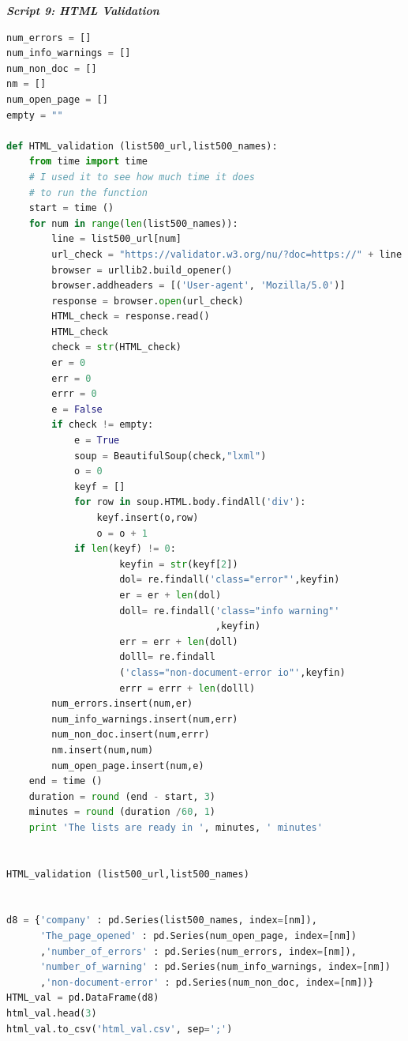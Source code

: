\documentclass{book}
\begin{document}
\begin{center}
\textit{\textbf{Script 9: HTML Validation}}\label{p9}
\end{center}
\begin{lstlisting}[language=Python]
num_errors = []
num_info_warnings = []
num_non_doc = [] 
nm = []
num_open_page = []
empty = ""
 
def HTML_validation (list500_url,list500_names):
    from time import time 
    # I used it to see how much time it does
    # to run the function
    start = time ()
    for num in range(len(list500_names)):
        line = list500_url[num] 
        url_check = "https://validator.w3.org/nu/?doc=https://" + line
        browser = urllib2.build_opener()
        browser.addheaders = [('User-agent', 'Mozilla/5.0')]
        response = browser.open(url_check)
        HTML_check = response.read()
        HTML_check
        check = str(HTML_check)
        er = 0
        err = 0
        errr = 0
        e = False
        if check != empty:
            e = True
            soup = BeautifulSoup(check,"lxml")
            o = 0
            keyf = []
            for row in soup.HTML.body.findAll('div'):
                keyf.insert(o,row)
                o = o + 1                    
            if len(keyf) != 0:       
                    keyfin = str(keyf[2])                     
                    dol= re.findall('class="error"',keyfin)            
                    er = er + len(dol)
                    doll= re.findall('class="info warning"'
                                     ,keyfin)            
                    err = err + len(doll)
                    dolll= re.findall
                    ('class="non-document-error io"',keyfin)            
                    errr = errr + len(dolll)
        num_errors.insert(num,er)
        num_info_warnings.insert(num,err)
        num_non_doc.insert(num,errr)  
        nm.insert(num,num) 
        num_open_page.insert(num,e)
    end = time ()
    duration = round (end - start, 3)
    minutes = round (duration /60, 1)
    print 'The lists are ready in ', minutes, ' minutes'
 

HTML_validation (list500_url,list500_names)
 

d8 = {'company' : pd.Series(list500_names, index=[nm]),
      'The_page_opened' : pd.Series(num_open_page, index=[nm])
      ,'number_of_errors' : pd.Series(num_errors, index=[nm]),
      'number_of_warning' : pd.Series(num_info_warnings, index=[nm])
      ,'non-document-error' : pd.Series(num_non_doc, index=[nm])}
HTML_val = pd.DataFrame(d8)    
html_val.head(3) 
html_val.to_csv('html_val.csv', sep=';') 
\end{lstlisting}
\end{document}
